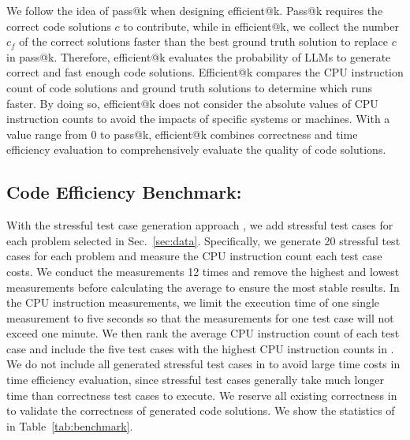 We follow the idea of pass@k when designing efficient@k. Pass@k requires the correct code solutions $c$ to contribute, while in efficient@k, we collect the number $c_f$ of the correct solutions faster than the best ground truth solution to replace $c$ in pass@k. Therefore, efficient@k evaluates the probability of LLMs to generate correct and fast enough code solutions. Efficient@k compares the CPU instruction count of code solutions and ground truth solutions to determine which runs faster. By doing so, efficient@k does not consider the absolute values of CPU instruction counts to avoid the impacts of specific systems or machines. With a value range from 0 to pass@k, efficient@k combines correctness and time efficiency evaluation to comprehensively evaluate the quality of code solutions.


\subsection{Code Efficiency Benchmark: \bench}



With the stressful test case generation approach \tool, we add stressful test cases for each problem selected in Sec.~\ref{sec:data}. Specifically, we generate 20 stressful test cases for each problem and measure the CPU instruction count each test case costs. We conduct the measurements 12 times and remove the highest and lowest measurements before calculating the average to ensure the most stable results. In the CPU instruction measurements, we limit the execution time of one single measurement to five seconds so that the measurements for one test case will not exceed one minute. We then rank the average CPU instruction count of each test case and include the five test cases with the highest CPU instruction counts in \bench. We do not include all generated stressful test cases in \bench to avoid large time costs in time efficiency evaluation, since stressful test cases generally take much longer time than correctness test cases to execute. We reserve all existing correctness in \bench to validate the correctness of generated code solutions. We show the statistics of \bench in Table~\ref{tab:benchmark}.